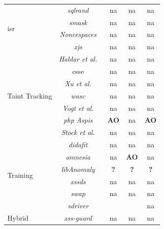\documentclass[conference]{IEEEtran}
\newcommand{\tick}{\ding{52}}
\begin{document}
\begin{table}
\begin{threeparttable}
\begin{small}
{\begin{tabular}{l|c|ccc}
  \hline
  \hline
  \multirow{4}{*}{{\sc isr}}
  &   {\it {\sc sql}rand}~\cite{BK04} & {\sc na} & {\sc na} & {\sc na} \\
  &   {\it {\sc sm}ask}~\cite{JB07} & {\sc na} & {\sc na} & {\sc na} \\
  &   {\it Noncespaces}~\cite{GC09} & {\sc na} & {\sc na} & {\sc na} \\
  &   {\it x{\sc js}}~\cite{APKLM10} & {\sc na} & {\sc na} & {\sc na} \\
  \hline
  \hline 
  \multirow{7}{*}{Taint Tracking}
  &   {\it Haldar et al.}~\cite{HCF05}  & {\sc na} & {\sc na} & {\sc na} \\
  &   {\sc csse}~\cite{PB05} & {\sc na} & {\sc na} & {\sc na} \\
  &   {\it Xu et al.}~\cite{XBS06}  & {\sc na} & {\sc na} & {\sc na} \\
  &   {\it {\sc wasc}}~\cite{NLC07} & {\sc na} & {\sc na} & {\sc na} \\
  &   {\it Vogt et al.}~\cite{VFJKKV07}  & {\sc na} & {\sc na} & {\sc na} \\
  &   {\it {\sc php} Aspis}~\cite{PMP11} & {\bf AO} & {\sc na} & {\bf AO} \\
  &   {\it Stock et al.}~\cite{SLMS14} & {\sc na} & {\sc na} & {\sc na} \\
  \hline
  \hline 
  \multirow{6}{*}{Training}
  &   {\it {\sc didafit}}~\cite{LLW02} & {\sc na} & {\sc na} & {\sc na} \\
  &   {\it {\sc amnesia}}~\cite{HO05,HO06,HO05b} & {\sc na} & {\bf AO} & {\sc na} \\
  &   {\it libAnomaly}~\cite{VMV05} & {\bf ?} & {\bf ?} & {\bf ?} \\
  &   {\it {\sc xssds}}~\cite{JEP08} & {\sc na} & {\sc na} & {\sc na} \\
  &   {\it {\sc swap}}~\cite{WPLKK09} & {\sc na} & {\sc na} & {\sc na} \\
  &   {\it {\sc sd}river}~\cite{MS09,MKS09,MKLS11} & \tick & \tick & {\sc na} \\
  \hline
  \hline
  \multirow{3}{*}{Hybrid}
  &   {\it {\sc xss-guard}}~\cite{BV08} & {\sc na} & {\sc na} & {\sc na} \\

\end{tabular}}
\end{small}
\end{threeparttable}
\end{table}
\end{document}
